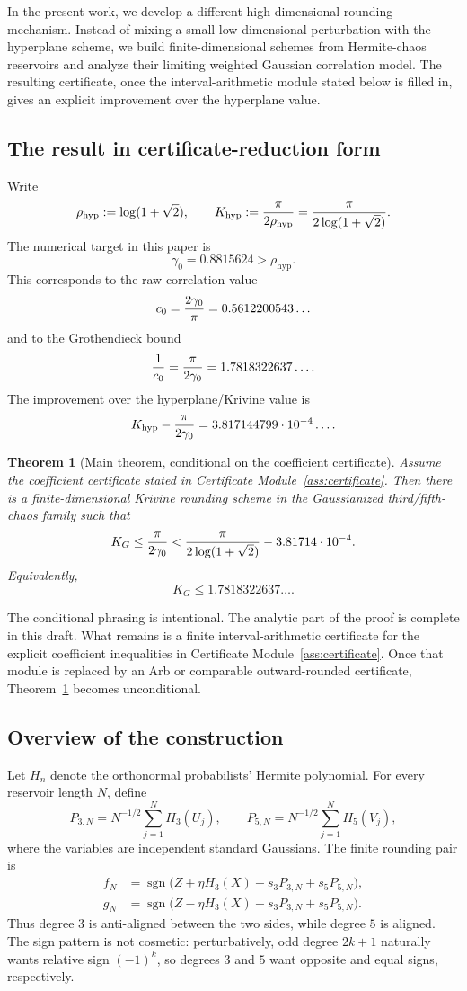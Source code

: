 \documentclass[11pt]{article}
\newcommand{\1}{\mathbf 1}
\newcommand{\sgn}{\operatorname{sgn}}
\newcommand{\KG}{K_G}
\newcommand{\Khyp}{K_{\mathrm{hyp}}}
\newcommand{\rhohyp}{\rho_{\mathrm{hyp}}}
\newcommand{\gammazero}{\gamma_0}
\theoremstyle{plain}
\newtheorem{theorem}{Theorem}[section]
\theoremstyle{definition}
\theoremstyle{remark}
\begin{document}
In the present work, we develop a different high-dimensional rounding mechanism.  Instead of mixing a small low-dimensional perturbation with the hyperplane scheme, we build finite-dimensional schemes from Hermite-chaos reservoirs and analyze their limiting weighted Gaussian correlation model.  The resulting certificate, once the interval-arithmetic module stated below is filled in, gives an explicit improvement over the hyperplane value.

\subsection{The result in certificate-reduction form}

Write
\[
  \rhohyp:=\log(1+\sqrt2),
  \qquad
  \Khyp:={\pi\over2\rhohyp}={\pi\over2\log(1+\sqrt2)}.
\]
The numerical target in this paper is
\[
  \gammazero=0.8815624>\rhohyp.
\]
This corresponds to the raw correlation value
\[
  c_0={2\gammazero\over \pi}=0.5612200543\ldots
\]
and to the Grothendieck bound
\[
  {1\over c_0}={\pi\over 2\gammazero}=1.7818322637\ldots .
\]
The improvement over the hyperplane/Krivine value is
\[
  \Khyp-{\pi\over 2\gammazero}=3.817144799\cdot 10^{-4}\ldots .
\]

\begin{theorem}[Main theorem, conditional on the coefficient certificate]\label{thm:main}
Assume the coefficient certificate stated in Certificate Module~\ref{ass:certificate}.  Then there is a finite-dimensional Krivine rounding scheme in the Gaussianized third/fifth-chaos family such that
\[
  \KG \le {\pi\over 2\gammazero}
  < {\pi\over 2\log(1+\sqrt2)}-3.81714\cdot 10^{-4}.
\]
Equivalently,
\[
  \KG \le 1.7818322637\ldots .
\]
\end{theorem}

The conditional phrasing is intentional.  The analytic part of the proof is complete in this draft.  What remains is a finite interval-arithmetic certificate for the explicit coefficient inequalities in Certificate Module~\ref{ass:certificate}.  Once that module is replaced by an Arb or comparable outward-rounded certificate, Theorem~\ref{thm:main} becomes unconditional.

\subsection{Overview of the construction}

Let \(H_n\) denote the orthonormal probabilists' Hermite polynomial.  For every reservoir length \(N\), define
\[
  P_{3,N}=N^{-1/2}\sum_{j=1}^N H_3(U_j),
  \qquad
  P_{5,N}=N^{-1/2}\sum_{j=1}^N H_5(V_j),
\]
where the variables are independent standard Gaussians.  The finite rounding pair is
\begin{align*}
  f_N &= \sgn\bigl(Z+\eta H_3(X)+s_3P_{3,N}+s_5P_{5,N}\bigr),\\
  g_N &= \sgn\bigl(Z-\eta H_3(X)-s_3P_{3,N}+s_5P_{5,N}\bigr).
\end{align*}
Thus degree \(3\) is anti-aligned between the two sides, while degree \(5\) is aligned.  The sign pattern is not cosmetic: perturbatively, odd degree \(2k+1\) naturally wants relative sign \((-1)^k\), so degrees \(3\) and \(5\) want opposite and equal signs, respectively.
\end{document}
